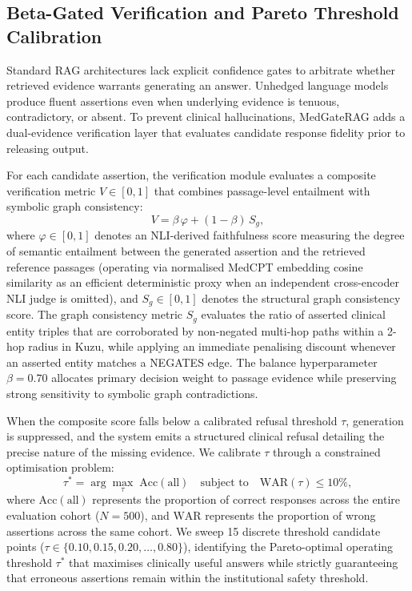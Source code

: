 \documentclass[preprint,12pt,a4paper]{elsarticle}
\begin{document}
\subsection{Beta-Gated Verification and Pareto Threshold Calibration}
\label{sec:verification}

Standard RAG architectures lack explicit confidence gates to arbitrate whether retrieved
evidence warrants generating an answer. Unhedged language models produce fluent assertions
even when underlying evidence is tenuous, contradictory, or absent. To prevent clinical
hallucinations, MedGateRAG adds a dual-evidence verification layer that evaluates candidate
response fidelity prior to releasing output.

For each candidate assertion, the verification module evaluates a composite verification
metric $V \in [0, 1]$ that combines passage-level entailment with symbolic graph consistency:
\begin{equation}
  V = \beta\,\varphi + (1 - \beta)\,S_g,
  \label{eq:verification}
\end{equation}
where $\varphi \in [0, 1]$ denotes an NLI-derived faithfulness score measuring the degree
of semantic entailment between the generated assertion and the retrieved reference passages
(operating via normalised MedCPT embedding cosine similarity as an efficient deterministic
proxy when an independent cross-encoder NLI judge is omitted), and $S_g \in [0, 1]$ denotes
the structural graph consistency score. The graph consistency metric $S_g$ evaluates the
ratio of asserted clinical entity triples that are corroborated by non-negated multi-hop
paths within a 2-hop radius in Kuzu, while applying an immediate penalising discount
whenever an asserted entity matches a \textsc{NEGATES} edge. The balance hyperparameter
$\beta=0.70$ allocates primary decision weight to passage evidence while preserving strong
sensitivity to symbolic graph contradictions.

When the composite score falls below a calibrated refusal threshold $\tau$, generation is
suppressed, and the system emits a structured clinical refusal detailing the precise
nature of the missing evidence. We calibrate $\tau$ through a constrained
optimisation problem:
\begin{equation}
  \tau^* = \arg\max_{\tau}\;\text{Acc}(\text{all}) \quad \text{subject to} \quad \text{WAR}(\tau) \leq 10\%,
  \label{eq:pareto}
\end{equation}
where $\text{Acc}(\text{all})$ represents the proportion of correct responses across the
entire evaluation cohort ($N=500$), and $\text{WAR}$ represents the proportion of wrong
assertions across the same cohort. We sweep 15 discrete threshold candidate points
($\tau \in \{0.10, 0.15, 0.20, \ldots, 0.80\}$), identifying the Pareto-optimal operating
threshold $\tau^*$ that maximises clinically useful answers while strictly guaranteeing that
erroneous assertions remain within the institutional safety threshold.
\end{document}
